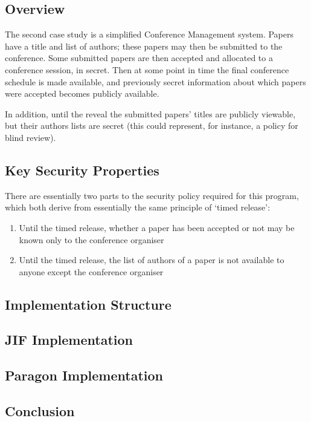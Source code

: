 \newpage

\subsection{Overview}

The second case study is a simplified Conference Management system. Papers have a title and list of authors; these papers may then be submitted to the conference. Some submitted papers are then accepted and allocated to a conference session, in secret. Then at some point in time the final conference schedule is made available, and previously secret information about which papers were accepted becomes publicly available.

In addition, until the reveal the submitted papers' titles are publicly viewable, but their authors lists are secret (this could represent, for instance, a policy for blind review).

\subsection{Key Security Properties}

There are essentially two parts to the security policy required for this program, which both derive from essentially the same principle of `timed release':

\begin{enumerate}
	\item Until the timed release, whether a paper has been accepted or not may be known only to the conference organiser
	
	\item Until the timed release, the list of authors of a paper is not available to anyone except the conference organiser
\end{enumerate}

\subsection{Implementation Structure}

\subsection{JIF Implementation}

\subsection{Paragon Implementation}

\subsection{Conclusion}